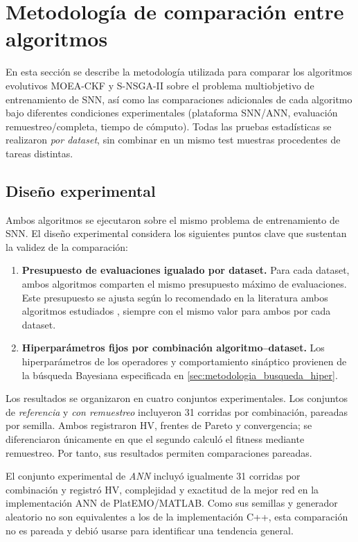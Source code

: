 \section{Metodología de comparación entre algoritmos}\label{sec:metodologia-comparacion}

En esta sección se describe la metodología utilizada para comparar los algoritmos evolutivos MOEA-CKF y S-NSGA-II sobre el problema multiobjetivo de entrenamiento de SNN, así como las comparaciones adicionales de cada algoritmo bajo diferentes condiciones experimentales (plataforma SNN/ANN, evaluación remuestreo/completa, tiempo de cómputo). Todas las pruebas estadísticas se realizaron \emph{por dataset}, sin combinar en un mismo test muestras procedentes de tareas distintas.

\subsection{Diseño experimental}

Ambos algoritmos se ejecutaron sobre el mismo problema de entrenamiento de SNN. El diseño experimental considera los siguientes puntos clave que sustentan la validez de la comparación:

\begin{enumerate}
    \item \textbf{Presupuesto de evaluaciones igualado por dataset.} Para cada dataset, ambos algoritmos comparten el mismo presupuesto máximo de evaluaciones. Este presupuesto se ajusta según lo recomendado en la literatura ambos algoritmos estudiados \cite{MOEA/CKF, 10066873_S-NSGA-II}, siempre con el mismo valor para ambos por cada dataset.
    \item \textbf{Hiperparámetros fijos por combinación algoritmo--dataset.} Los hiperparámetros de los operadores y comportamiento sináptico provienen de la búsqueda Bayesiana especificada en \ref{sec:metodologia_busqueda_hiper}.
\end{enumerate}

Los resultados se organizaron en cuatro conjuntos experimentales. Los conjuntos de \textit{referencia} y \textit{con remuestreo} incluyeron 31 corridas por combinación, pareadas por semilla. Ambos registraron HV, frentes de Pareto y convergencia; se diferenciaron únicamente en que el segundo calculó el fitness mediante remuestreo. Por tanto, sus resultados permiten comparaciones pareadas.

El conjunto experimental de \textit{ANN} incluyó igualmente 31 corridas por combinación y registró HV, complejidad y exactitud de la mejor red en la implementación ANN de PlatEMO/MATLAB. Como sus semillas y generador aleatorio no son equivalentes a los de la implementación C++, esta comparación no es pareada y debió usarse para identificar una tendencia general.


